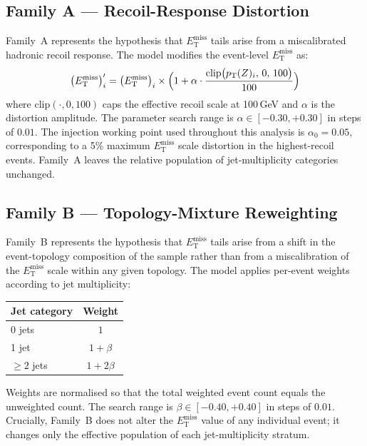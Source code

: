 \documentclass[a4paper,11pt]{article}
\newcommand{\MET}{\ensuremath{E_{\mathrm{T}}^{\mathrm{miss}}}\xspace}
\begin{document}
\subsection{Family A --- Recoil-Response Distortion}

Family~A represents the hypothesis that \MET tails arise from a
miscalibrated hadronic recoil response.
The model modifies the event-level \MET as:
\begin{equation}
  \bigl(E_{\mathrm{T}}^{\mathrm{miss}}\bigr)'_i =
  \bigl(E_{\mathrm{T}}^{\mathrm{miss}}\bigr)_i \times
  \Bigl(1 + \alpha \cdot
    \frac{\mathrm{clip}\bigl(p_{\mathrm{T}}(Z)_i,\,0,\,100\bigr)}{100}
  \Bigr)
  \label{eq:familyA}
\end{equation}
where $\mathrm{clip}(\cdot,0,100)$ caps the effective recoil scale at
100\,GeV and $\alpha$ is the distortion amplitude.
The parameter search range is $\alpha \in [-0.30, +0.30]$ in steps of
$0.01$.
The injection working point used throughout this analysis is $\alpha_0 =
0.05$, corresponding to a 5\% maximum \MET scale distortion in the
highest-recoil events.
Family~A leaves the relative population of jet-multiplicity categories
unchanged.

\subsection{Family B --- Topology-Mixture Reweighting}

Family~B represents the hypothesis that \MET tails arise from a shift in
the event-topology composition of the sample rather than from a
miscalibration of the \MET scale within any given topology.
The model applies per-event weights according to jet multiplicity:
\begin{center}
\begin{tabular}{lc}
  \toprule
  Jet category & Weight \\
  \midrule
  0 jets   & $1$ \\
  1 jet    & $1 + \beta$ \\
  $\geq\!2$ jets & $1 + 2\beta$ \\
  \bottomrule
\end{tabular}
\end{center}
Weights are normalised so that the total weighted event count equals the
unweighted count.
The search range is $\beta \in [-0.40, +0.40]$ in steps of $0.01$.
Crucially, Family~B does not alter the \MET value of any individual event;
it changes only the effective population of each jet-multiplicity stratum.
\end{document}
